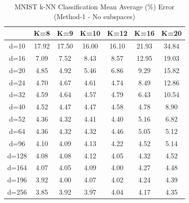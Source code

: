 \begin{table}[H]
\centering
\label{tab:table10}
\begin{tabular}{|c|c|c|c|c|c|c|}
\hline
& K=8 & K=9 & K=10 & K=12 & K=16 & K=20 \\
\hline
d=10 & 17.92 & 17.50 & 16.00 & 16.10 & 21.93 & 34.84 \\
d=16 & 7.09 & 7.52 & 8.43 & 8.57 & 12.95 & 19.03 \\
d=20 & 4.85 & 4.92 & 5.46 & 6.86 & 9.29 & 15.82 \\
d=24 & 4.70 & 4.67 & 4.61 & 4.74 & 8.49 & 12.86 \\
d=32 & 4.59 & 4.64 & 4.57 & 4.79 & 6.43 & 10.54 \\
d=40 & 4.52 & 4.47 & 4.47 & 4.58 & 4.78 & 8.90 \\
d=52 & 4.36 & 4.32 & 4.41 & 4.40 & 5.16 & 6.82 \\
d=64 & 4.36 & 4.32 & 4.32 & 4.46 & 5.05 & 5.12 \\
d=96 & 4.10 & 4.09 & 4.13 & 4.22 & 4.52 & 5.14 \\
d=128 & 4.08 & 4.08 & 4.12 & 4.05 & 4.32 & 4.52 \\
d=164 & 4.07 & 4.05 & 4.09 & 4.00 & 4.27 & 4.48 \\
d=196 & 3.92 & 4.00 & 4.07 & 4.02 & 4.24 & 4.39 \\
d=256 & 3.85 & 3.92 & 3.97 & 4.04 & 4.17 & 4.35 \\
\hline
\end{tabular}
\caption{MNIST k-NN Classification Mean Average (\%) Error (Method-1 - No subspaces)}
\end{table}

